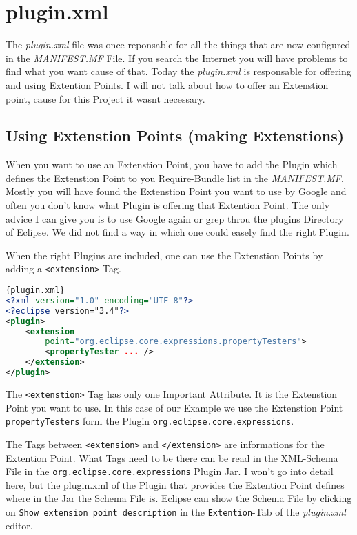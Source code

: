 \documentclass[a4paper,10pt]{report}
\begin{document}
\section{plugin.xml}
The {\it plugin.xml} file was once reponsable for all the things that are now configured in the {\it MANIFEST.MF} File. If you search the Internet you will have problems to find what you want cause of that. Today the {\it plugin.xml} is responsable for offering and using Extention Points. I will not talk about how to offer an Extenstion point, cause for this Project it wasnt necessary.

\subsection{Using Extenstion Points (making Extenstions)}
When you want to use an Extenstion Point, you have to add the Plugin which defines the Extenstion Point to you Require-Bundle list in the {\it MANIFEST.MF}. Mostly you will have found the Extenstion Point you want to use by Google and often you don't know what Plugin is offering that Extention Point. The only advice I can give you is to use Google again or grep throu the plugins Directory of Eclipse. We did not find a way in which one could easely find the right Plugin.

When the right Plugins are included, one can use the Extenstion Points by adding a \verb!<extension>! Tag.
\begin{lstlisting}[language=XML,caption=Use Extenstion Point ({\it plugin.xml})]{plugin.xml}
<?xml version="1.0" encoding="UTF-8"?>
<?eclipse version="3.4"?>
<plugin>
 	<extension 
	    point="org.eclipse.core.expressions.propertyTesters">
   		<propertyTester ... />
 	</extension>
</plugin>
\end{lstlisting}

The \verb!<extenstion>! Tag has only one Important Attribute. It is the Extenstion Point you want to use. In this case of our Example we use the Extenstion Point \verb!propertyTesters! form the Plugin \verb!org.eclipse.core.expressions!.

The Tags between \verb!<extension>! and \verb!</extension>! are informations for the Extention Point. What Tags need to be there can be read in the XML-Schema File in the \verb!org.eclipse.core.expressions! Plugin Jar. I won't go into detail here, but the plugin.xml of the Plugin that provides the Extention Point defines where in the Jar the Schema File is. Eclipse can show the Schema File by clicking on \verb!Show extension point description! in the \verb!Extention!-Tab of the {\it plugin.xml} editor.
\end{document}
